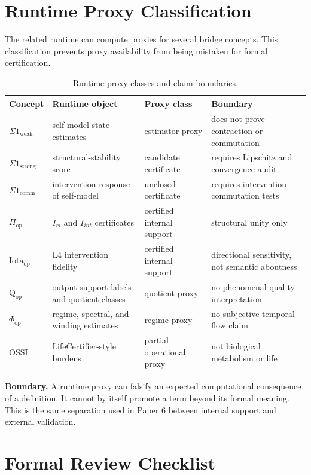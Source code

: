 \documentclass[11pt,a4paper]{article}
\theoremstyle{definition}
\newcommand{\Qop}{\mathrm{Q}_{\mathrm{op}}}
\newcommand{\Piop}{\Pi_{\mathrm{op}}}
\newcommand{\Iotaop}{\mathrm{Iota}_{\mathrm{op}}}
\newcommand{\Phiop}{\Phi_{\mathrm{op}}}
\begin{document}
\section{Runtime Proxy Classification}

The related runtime can compute proxies for several bridge concepts. This
classification prevents proxy availability from being mistaken for formal
certification.

\begin{table}[ht]
\centering
\caption{Runtime proxy classes and claim boundaries.}
\label{tab:runtime-proxy-classification}
\small
\begin{tabularx}{\textwidth}{>{\raggedright\arraybackslash}p{2.7cm} Y Y Y}
\toprule
Concept & Runtime object & Proxy class & Boundary \\
\midrule
$\Sigma1_{\mathrm{weak}}$ & self-model state estimates & estimator proxy & does not prove contraction or commutation \\
$\Sigma1_{\mathrm{strong}}$ & structural-stability score & candidate certificate & requires Lipschitz and convergence audit \\
$\Sigma1_{\mathrm{comm}}$ & intervention response of self-model & unclosed certificate & requires intervention commutation tests \\
$\Piop$ & $I_{ri}$ and $I_{int}$ certificates & certified internal support & structural unity only \\
$\Iotaop$ & L4 intervention fidelity & certified internal support & directional sensitivity, not semantic aboutness \\
$\Qop$ & output support labels and quotient classes & quotient proxy & no phenomenal-quality interpretation \\
$\Phiop$ & regime, spectral, and winding estimates & regime proxy & no subjective temporal-flow claim \\
OSSI & LifeCertifier-style burdens & partial operational proxy & not biological metabolism or life \\
\bottomrule
\end{tabularx}
\end{table}

\noindent\textbf{Boundary.}\enspace
A runtime proxy can falsify an expected computational consequence of a
definition. It cannot by itself promote a term beyond its formal meaning. This
is the same separation used in Paper 6 between internal support and external
validation.

\section{Formal Review Checklist}
\end{document}
